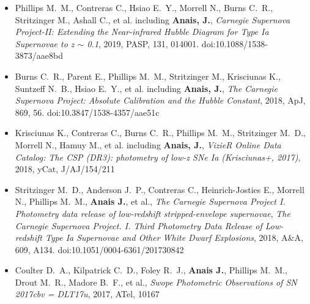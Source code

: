 \begin{itemize}
    \item {Phillips M.~M., Contreras C., Hsiao E.~Y., Morrell N., Burns C.~R., Stritzinger M., Ashall C., et al. including \textbf{Anais, J.}, \textit{Carnegie Supernova Project-II: Extending the Near-infrared Hubble Diagram for Type Ia Supernovae to z {\ensuremath{\sim}} 0.1}, 2019, PASP, 131, 014001. doi:10.1088/1538-3873/aae8bd}
    \item {Burns C.~R., Parent E., Phillips M.~M., Stritzinger M., Krisciunas K., Suntzeff N.~B., Hsiao E.~Y., et al. including \textbf{Anais, J.}, \textit{The Carnegie Supernova Project: Absolute Calibration and the Hubble Constant}, 2018, ApJ, 869, 56. doi:10.3847/1538-4357/aae51c}
    \item {Krisciunas K., Contreras C., Burns C.~R., Phillips M.~M., Stritzinger M.~D., Morrell N., Hamuy M., et al. including \textbf{Anais, J.}, \textit{VizieR Online Data Catalog: The CSP (DR3): photometry of low-z SNe Ia (Krisciunas+, 2017)}, 2018, yCat, J/AJ/154/211}
    \item {Stritzinger M.~D., Anderson J.~P., Contreras C., Heinrich-Josties E., Morrell N., Phillips M.~M., \textbf{Anais J.}, et al., \textit{The Carnegie Supernova Project I. Photometry data release of low-redshift stripped-envelope supernovae}, \textit{The Carnegie Supernova Project. I. Third Photometry Data Release of Low-redshift Type Ia Supernovae and Other White Dwarf Explosions}, 2018, A\&A, 609, A134. doi:10.1051/0004-6361/201730842}
    \item {Coulter D.~A., Kilpatrick C.~D., Foley R.~J., \textbf{Anais J.}, Phillips M.~M., Drout M.~R., Madore B.~F., et al., \textit{Swope Photometric Observations of SN 2017cbv = DLT17u}, 2017, ATel, 10167}  
\end{itemize}
